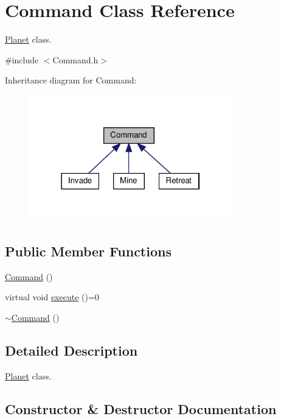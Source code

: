 \hypertarget{classCommand}{}\section{Command Class Reference}
\label{classCommand}


\hyperlink{classPlanet}{Planet} class.  




{\ttfamily \#include $<$Command.\+h$>$}



Inheritance diagram for Command\+:\nopagebreak
\begin{figure}[H]
\begin{center}
\leavevmode
\includegraphics[width=250pt]{classCommand__inherit__graph}
\end{center}
\end{figure}
\subsection*{Public Member Functions}
\begin{DoxyCompactItemize}
\item 
\hyperlink{classCommand_a18df2d81039392daeb0b78c346a70537}{Command} ()
\item 
virtual void \hyperlink{classCommand_a6fd7d9bd8df8bfc881e4d6c7cd1878b7}{execute} ()=0
\item 
\hyperlink{classCommand_ab552bb3a07fdd1acbfd8ea76e69b2278}{$\sim$\+Command} ()
\end{DoxyCompactItemize}


\subsection{Detailed Description}
\hyperlink{classPlanet}{Planet} class. 

\subsection{Constructor \& Destructor Documentation}
\mbox{\label{classCommand_a18df2d81039392daeb0b78c346a70537}} 
